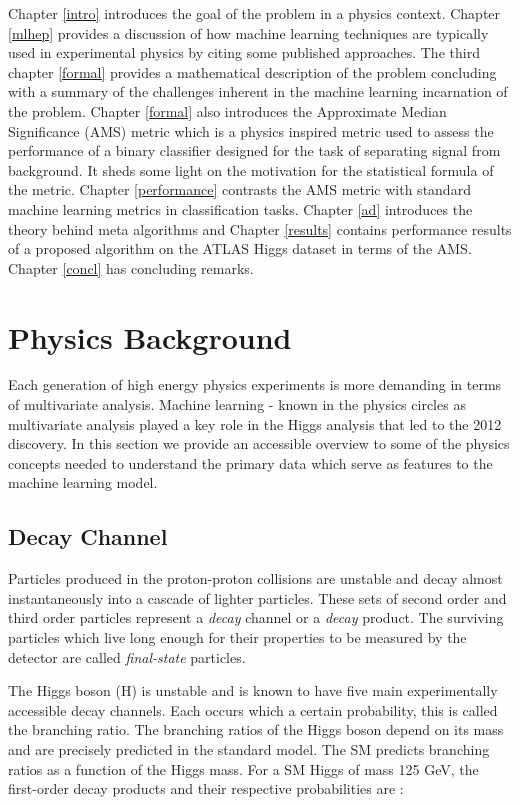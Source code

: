 Chapter \ref{intro} introduces the goal of the problem in a physics context. Chapter \ref{mlhep} provides a discussion of how machine learning techniques are typically used in experimental physics by citing some published approaches. The third chapter \ref{formal} provides a mathematical description of the problem concluding with a summary of the challenges inherent in the machine learning incarnation of the problem. Chapter \ref{formal} also introduces the Approximate Median Significance (\gls{AMS}) metric which is a physics inspired metric used to assess the performance of a binary classifier designed for the task of separating signal from background. It sheds some light on the motivation for the statistical formula of the metric. Chapter \ref{performance} contrasts the AMS metric with standard machine learning metrics in classification tasks. Chapter \ref{ad} introduces the theory behind meta algorithms and Chapter \ref{results} contains performance results of a proposed algorithm on the ATLAS Higgs dataset in terms of the AMS. Chapter \ref{concl} has concluding remarks.

\section{Physics Background} 

Each generation of high energy physics experiments is more demanding in terms of multivariate analysis. Machine learning - known in the physics circles as multivariate analysis played a key role in the Higgs analysis that led to the 2012 discovery. In this section we provide an accessible overview to some of the physics concepts needed to understand the primary data which serve as features to the machine learning model. 

\subsection{Decay Channel}

Particles produced in the proton-proton collisions are unstable and decay almost instantaneously into a cascade of lighter particles. These sets of second order and third order particles represent a \textit{decay} channel or a \textit{decay} product. The surviving particles which live long enough for their properties to be measured by the detector are called \textit{final-state} particles. 

The Higgs boson (H) is unstable and is known to have five main experimentally accessible decay channels. Each occurs which a certain probability, this is called the branching ratio. The branching ratios of the Higgs boson depend on its mass and are precisely predicted in the standard model. The SM predicts branching ratios as a function of the Higgs mass. For a SM Higgs of mass 125 GeV, the first-order decay products and their respective probabilities are :

